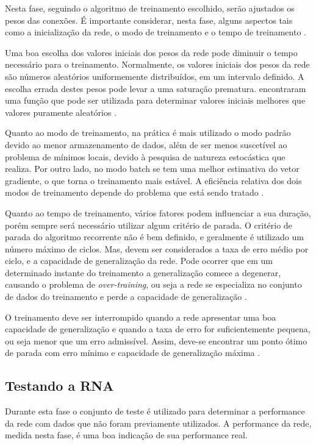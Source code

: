Nesta fase, seguindo o algoritmo de treinamento escolhido, serão ajustados os pesos das conexões. É importante considerar, nesta fase, alguns aspectos tais como a inicialização da rede, o modo de treinamento e o tempo de treinamento \cite{aplicacao}.

Uma boa escolha dos valores iniciais dos pesos da rede pode diminuir o tempo necessário para o treinamento. Normalmente, os valores iniciais dos pesos da rede são números aleatórios uniformemente distribuídos, em um intervalo definido. A escolha errada destes pesos pode levar a uma saturação prematura.  encontraram uma função que pode ser utilizada para determinar valores iniciais melhores que valores puramente aleatórios \cite{aplicacao}.

Quanto ao modo de treinamento, na prática é mais utilizado o modo padrão devido ao menor armazenamento de dados, além de ser menos suscetível ao problema de mínimos locais, devido à pesquisa de natureza estocástica que realiza. Por outro lado, no modo batch se tem uma melhor estimativa do vetor gradiente, o que torna o treinamento mais estável. A eficiência relativa dos dois modos de treinamento depende do problema que está sendo tratado \cite{aplicacao}.

Quanto ao tempo de treinamento, vários fatores podem influenciar a sua duração, porém sempre será necessário utilizar algum critério de parada. O critério de parada do algoritmo recorrente não é bem definido, e geralmente é utilizado um número máximo de ciclos. Mas, devem ser considerados a taxa de erro médio por ciclo, e a capacidade de generalização da rede. Pode ocorrer que em um determinado instante do treinamento a generalização comece a degenerar, causando o problema de \textit{over-training}, ou seja a rede se especializa no conjunto de dados do treinamento e perde a capacidade de generalização \cite{aplicacao}.

O treinamento deve ser interrompido quando a rede apresentar uma boa capacidade de generalização e quando a taxa de erro for suficientemente pequena, ou seja menor que um erro admissível. Assim, deve-se encontrar um ponto ótimo de parada com erro mínimo e capacidade de generalização máxima \cite{aplicacao}.

\subsection{Testando a RNA}

Durante esta fase o conjunto de teste é utilizado para determinar a performance da rede com dados que não foram previamente utilizados. A performance da rede, medida nesta fase, é uma boa indicação de sua performance real.

